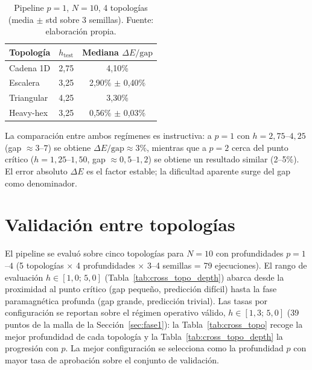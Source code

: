 \documentclass[11pt,a4paper,spanish]{book}
\begin{document}
\begin{table}[h]
\centering
\caption[Pipeline a $p = 1$, $N = 10$ en cuatro topologías]{Pipeline $p = 1$, $N = 10$, 4 topologías (media $\pm$ std sobre 3 semillas). Fuente: elaboración propia.\protect\footnotemark}
\label{tab:results_p1}
\begin{tabular}{lcc}
\toprule
\textbf{Topología} & \textbf{$h_{\text{test}}$} & \textbf{Mediana $\Delta E/\text{gap}$} \\
\midrule
Cadena 1D & 2,75 & 4,10\% \\
Escalera & 3,25 & 2,90\% $\pm$ 0,40\% \\
Triangular & 4,25 & 3,30\% \\
Heavy-hex & 3,25 & 0,56\% $\pm$ 0,03\% \\
\bottomrule
\end{tabular}
\end{table}

La comparación entre ambos regímenes es instructiva: a $p = 1$ con $h = 2,75$--$4,25$ (gap $\approx 3$--$7$) se obtiene $\Delta E/\text{gap} \approx 3\%$, mientras que a $p = 2$ cerca del punto crítico ($h = 1,25$--$1,50$, gap $\approx 0,5$--$1,2$) se obtiene un resultado similar (2--5\%). El error absoluto $\Delta E$ es el factor estable; la dificultad aparente surge del gap como denominador.

\section{Validación entre topologías}

El pipeline se evaluó sobre cinco topologías para $N = 10$ con profundidades $p = 1$--$4$ (5 topologías $\times$ 4 profundidades $\times$ 3--4 semillas = 79 ejecuciones). El rango de evaluación $h \in [1{,}0;\, 5{,}0]$ (Tabla~\ref{tab:cross_topo_depth}) abarca desde la proximidad al punto crítico (gap pequeño, predicción difícil) hasta la fase paramagnética profunda (gap grande, predicción trivial). Las tasas por configuración se reportan sobre el régimen operativo válido, $h \in [1{,}3;\, 5{,}0]$ (39 puntos de la malla de la Sección~\ref{sec:fase1}): la Tabla~\ref{tab:cross_topo} recoge la mejor profundidad de cada topología y la Tabla~\ref{tab:cross_topo_depth} la progresión con $p$. La mejor configuración se selecciona como la profundidad $p$ con mayor tasa de aprobación sobre el conjunto de validación.
\end{document}
